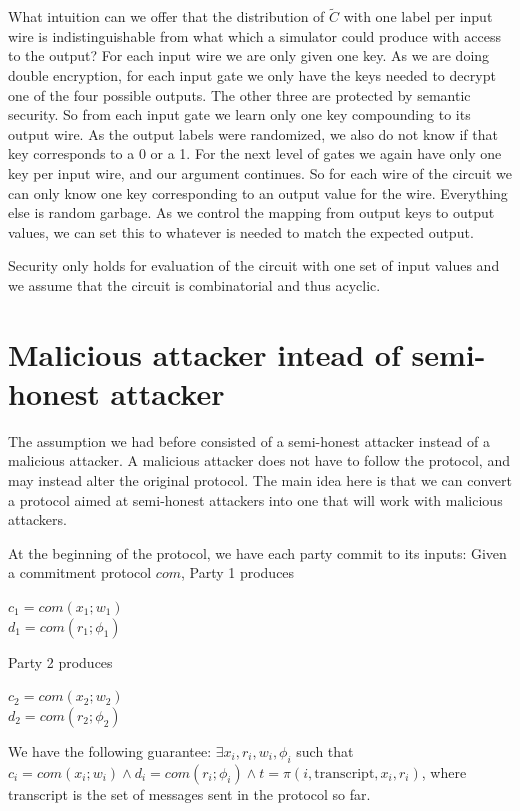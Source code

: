 \documentclass[12pt]{tufte-book}
\begin{document}
What intuition can we offer that the 
distribution of $\tilde{C}$ with one label per input wire 
is indistinguishable from what which a simulator could produce with access to the output?
For each input wire we are only given one key.
As we are doing double encryption,
for each input gate we only have the keys needed to decrypt one of the four possible outputs.
The other three are protected by semantic security.
So from each input gate we learn only one key compounding to its output wire.
As the output labels were randomized, we also do not know if that key corresponds to a 0 or a 1. 
For the next level of gates we again have only one key per input wire, and our argument continues. 
So for each wire of the circuit we can only know one key corresponding to an output value for the wire. 
 Everything else is random garbage.
As we control the mapping from output keys to output values, we can set this to whatever is needed to
match the expected output. 


Security only holds for evaluation of the circuit with one set of input values and 
we assume that the circuit is combinatorial and thus acyclic. 








\section{Malicious attacker intead of semi-honest attacker}

The assumption we had before consisted of a semi-honest attacker instead of a malicious attacker. A malicious attacker does not have to follow the protocol, and may instead alter the original protocol. The main idea here is that we can convert a protocol aimed at semi-honest attackers into one that will work with malicious attackers.

At the beginning of the protocol, we have each party commit to its inputs:
Given a commitment protocol $com$, Party 1 produces
\begin{center}
$c_1 = com(x_1; w_1)$ \\
$d_1 = com(r_1; \phi_1)$ \\
\end{center}
Party 2 produces
\begin{center}
$c_2 = com(x_2; w_2)$\\
$d_2 = com(r_2; \phi_2)$
\end{center}

We have the following guarantee: $\exists x_i, r_i, w_i, \phi_i$ such that $c_i = com(x_i; w_i) \wedge d_i = com(r_i; \phi_i) \wedge t = \pi(i,\text{transcript}, x_i, r_i)$, where transcript is the set of messages sent in the protocol so far.
\end{document}
